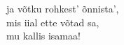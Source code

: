 \documentclass[10pt]{book}
\newenvironment{changemargin}[2]{
  \begin{list}{}{
    \setlength{\topsep}{0pt}
    \setlength{\leftmargin}{#1}
    \setlength{\rightmargin}{#2}
    \setlength{\listparindent}{\parindent}
    \setlength{\itemindent}{\parindent}
    \setlength{\parsep}{\parskip}
  }
  \item[]
}{
  \end{list}
}
\begin{document}
{\begin{changemargin}{ 0.9in }{ 0.1in }
{      \noindent \nopagebreak[4] ja võtku rohkest' õnnista', \\
      \noindent \nopagebreak[4] mis iial ette võtad sa, \\
      \noindent \nopagebreak[4] mu kallis isamaa! \\
  }
  \end{changemargin}
  \pagebreak[1]
\end{document}
